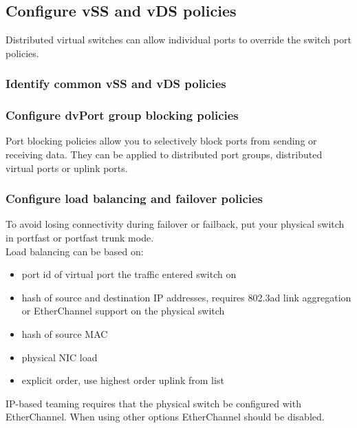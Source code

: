 \subsection{Configure vSS and vDS policies}

Distributed virtual switches can allow individual ports to override the switch
port policies.

\subsubsection{Identify common vSS and vDS policies}

\subsubsection{Configure dvPort group blocking policies}

Port blocking policies allow you to selectively block ports from sending or
receiving data. They can be applied to distributed port groups, distributed
virtual ports or uplink ports.

\subsubsection{Configure load balancing and failover policies}

To avoid losing connectivity during failover or failback, put your physical
switch in portfast or portfast trunk mode.\\

Load balancing can be based on:

\begin{itemize}

\item port id of virtual port the traffic entered switch on

\item hash of source and destination IP addresses, requires 802.3ad link
aggregation or EtherChannel support on the physical switch


\item hash of source MAC

\item physical NIC load

\item explicit order, use highest order uplink from list

\end{itemize}

IP-based teaming requires that the physical switch be configured with
EtherChannel. When using other options EtherChannel should be disabled.\\

